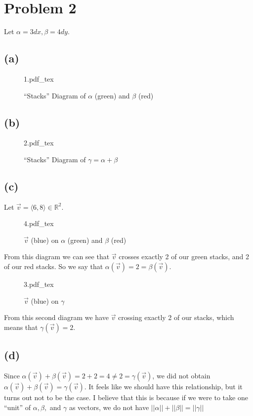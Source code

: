 \documentclass{article}
\newcommand{\incfig}[1]{%
    \def\svgwidth{.25\columnwidth}
    {#1.pdf_tex}
}
\theoremstyle{definition}
\begin{document}
\section*{Problem 2}
Let $\alpha = 3dx, \beta = 4dy$.
\subsection*{(a)}
\begin{figure}[ht]
    \centering
    \incfig{1}
    \caption{``Stacks'' Diagram of $\alpha$ (green) and $\beta$ (red)}
    \label{fig:1}
\end{figure}
\subsection*{(b)}
\begin{figure}[ht]
    \centering
    \incfig{2}
    \caption{``Stacks'' Diagram of $\gamma = \alpha + \beta$}
    \label{fig:2}
\end{figure}
\subsection*{(c)}
Let $\vec{v} = \langle 6, 8 \rangle \in \mathbb{R}^2$.
\begin{figure}[ht]
    \centering
    \incfig{4}
    \caption{$\vec{v}$ (blue) on $\alpha$ (green) and $\beta$ (red)}
    \label{fig:4}
\end{figure}
From this diagram  we can see that $\vec{v}$ crosses exactly 2 of our green stacks,
and 2 of our red stacks. So we say that $\alpha(\vec{v}) = 2 = \beta(\vec{v})$.
\begin{figure}[ht]
    \centering
    \incfig{3}
    \caption{$\vec{v}$ (blue) on $\gamma$}
    \label{fig:3}
\end{figure}
From this second diagram  we have $\vec{v}$ crossing exactly 2 of our stacks, which
means that $\gamma(\vec{v}) = 2$.
\subsection*{(d)}
Since $\alpha(\vec{v}) + \beta(\vec{v}) = 2 + 2 = 4 \neq 2 = \gamma(\vec{v})$, we did not obtain $\alpha(\vec{v}) + \beta(\vec{v}) = \gamma(\vec{v})$.
It feels like we should have this relationship, but it turns out not to be the case.
I believe that this is because if we were to take one ``unit'' of $\alpha,\beta,$ and $\gamma$
as vectors, we do not have $||\alpha|| + ||\beta|| = ||\gamma||$
\end{document}
